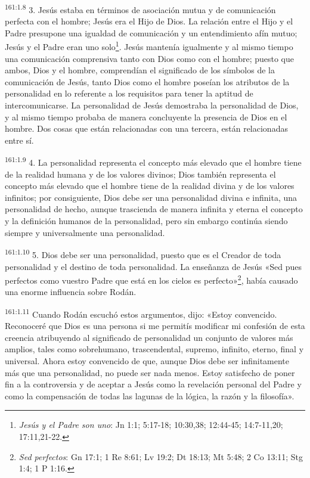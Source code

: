 \par 
\textsuperscript{161:1.8} 3. Jesús estaba en términos de asociación mutua y de comunicación perfecta con el hombre; Jesús era el Hijo de Dios. La relación entre el Hijo y el Padre presupone una igualdad de comunicación y un entendimiento afín mutuo; Jesús y el Padre eran uno solo\footnote{\textit{Jesús y el Padre son uno}: Jn 1:1; 5:17-18; 10:30,38; 12:44-45; 14:7-11,20; 17:11,21-22.}. Jesús mantenía igualmente y al mismo tiempo una comunicación comprensiva tanto con Dios como con el hombre; puesto que ambos, Dios y el hombre, comprendían el significado de los símbolos de la comunicación de Jesús, tanto Dios como el hombre poseían los atributos de la personalidad en lo referente a los requisitos para tener la aptitud de intercomunicarse. La personalidad de Jesús demostraba la personalidad de Dios, y al mismo tiempo probaba de manera concluyente la presencia de Dios en el hombre. Dos cosas que están relacionadas con una tercera, están relacionadas entre sí.

\par 
\textsuperscript{161:1.9} 4. La personalidad representa el concepto más elevado que el hombre tiene de la realidad humana y de los valores divinos; Dios también representa el concepto más elevado que el hombre tiene de la realidad divina y de los valores infinitos; por consiguiente, Dios debe ser una personalidad divina e infinita, una personalidad de hecho, aunque trascienda de manera infinita y eterna el concepto y la definición humanos de la personalidad, pero sin embargo continúa siendo siempre y universalmente una personalidad.

\par 
\textsuperscript{161:1.10} 5. Dios debe ser una personalidad, puesto que es el Creador de toda personalidad y el destino de toda personalidad. La enseñanza de Jesús «Sed pues perfectos como vuestro Padre que está en los cielos es perfecto»\footnote{\textit{Sed perfectos}: Gn 17:1; 1 Re 8:61; Lv 19:2; Dt 18:13; Mt 5:48; 2 Co 13:11; Stg 1:4; 1 P 1:16.}, había causado una enorme influencia sobre Rodán.

\par 
\textsuperscript{161:1.11} Cuando Rodán escuchó estos argumentos, dijo: «Estoy convencido. Reconoceré que Dios es una persona si me permitís modificar mi confesión de esta creencia atribuyendo al significado de personalidad un conjunto de valores más amplios, tales como sobrehumano, trascendental, supremo, infinito, eterno, final y universal. Ahora estoy convencido de que, aunque Dios debe ser infinitamente más que una personalidad, no puede ser nada menos. Estoy satisfecho de poner fin a la controversia y de aceptar a Jesús como la revelación personal del Padre y como la compensación de todas las lagunas de la lógica, la razón y la filosofía».

